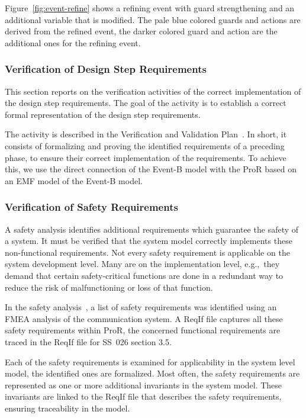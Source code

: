 Figure~\ref{fig:event-refine} shows a refining event with guard strengthening
and an additional variable that is modified. The pale blue colored guards and
actions are derived from the refined event, the darker colored guard and action
are the additional ones for the refining event.


\subsubsection{Verification of Design Step Requirements}
\label{sec:verif-design-step}

This section reports on the verification activities of the correct
implementation of the design step requirements. The goal of the activity is to
establish a correct formal representation of the design step requirements.

The activity is described in the Verification and Validation
Plan~\cite{vnvplan}.  In short, it consists of formalizing and proving the
identified requirements of a preceding phase, to ensure their correct
implementation of the requirements. To achieve this, we use the direct
connection of the Event-B model with the ProR based on an EMF model of the
Event-B model.


\subsubsection{Verification of Safety Requirements}
\label{sec:verif-safety-requ}

A safety analysis identifies additional requirements which guarantee the safety
of a system. It must be verified that the system model correctly implements
these non-functional requirements. Not every safety requirement is applicable on
the system development level. Many are on the implementation level, e.g.,\ they
demand that certain safety-critical functions are done in a redundant way to
reduce the risk of malfunctioning or loss of that function.

In the safety analysis~\cite{safetyBrice}, a list of safety requirements was
identified using an FMEA analysis of the communication system. A ReqIf file
captures all these safety requirements within ProR, the concerned functional
requirements are traced in the ReqIf file for SS~026 section 3.5.

Each of the safety requirements is examined for applicability in the system
level model, the identified ones are formalized. Most often, the safety
requirements are represented as one or more additional invariants in the system
model. These invariants are linked to the ReqIf file that describes the safety
requirements, ensuring traceability in the model.

